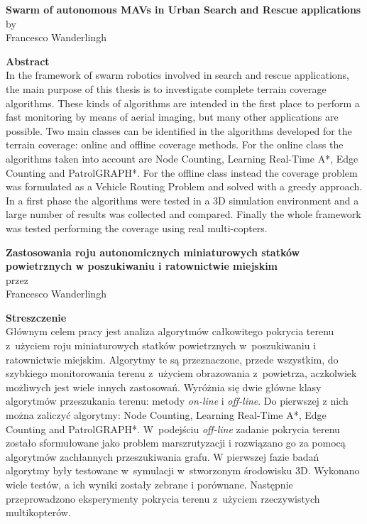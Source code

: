\begin{center}
\Large {\textbf{Swarm of autonomous MAVs in Urban Search and Rescue applications}}\\
\large {by  \\
Francesco Wanderlingh}
\end{center}

\vskip 1cm
\Large {\textbf{Abstract}} \\ 

\large{
In the framework of swarm robotics involved in search and rescue applications, the main purpose of this thesis is to investigate complete 
terrain coverage algorithms. These kinds of algorithms are intended in the first place to perform a fast monitoring by means of aerial 
imaging, but many other applications are possible. Two main classes can be identified in the algorithms developed for the terrain coverage: 
online and offline coverage methods. For the online class the algorithms taken into account are Node Counting, Learning Real-Time A*, Edge 
Counting and PatrolGRAPH*. For the offline class instead the coverage problem was formulated as a Vehicle Routing Problem and solved with a 
greedy approach. In a first phase the algorithms were tested in a 3D simulation environment and a large number of results was collected and 
compared. Finally the whole framework was tested performing the coverage using real multi-copters. }
\clearpage
\null\newpage

\begin{center}
\Large {\bf{Zastosowania roju autonomicznych miniaturowych statków powietrznych w poszukiwaniu i ratownictwie miejskim}}\\
\large {przez  \\
Francesco Wanderlingh}
\end{center}

\vskip 1cm
\Large {\textbf{Streszczenie}} \\


\large{
Głównym celem pracy jest analiza algorytmów całkowitego pokrycia terenu z~użyciem roju miniaturowych statków powietrznych w~poszukiwaniu i ratownictwie miejskim. Algorytmy te są przeznaczone, przede wszystkim, do szybkiego monitorowania terenu z~użyciem obrazowania z~powietrza, aczkolwiek możliwych jest wiele innych zastosowań. Wyróżnia się dwie główne klasy algorytmów przeszukania terenu: me\-tody \emph{on-line} i \emph{off-line}. Do pierwszej z nich można zaliczyć algorytmy: Node Counting, Learning Real-Time A*, Edge Counting and PatrolGRAPH*. W~podejściu \emph{off-line} zadanie pokrycia terenu zostało sformułowane jako problem marszrutyzacji i rozwiązano go za pomocą algorytmów zachłannych przeszukiwania grafu. W pierwszej fazie badań algorytmy były testowane w~symulacji w~stworzonym środowisku 3D. Wykonano wiele testów, a ich wyniki zostały zebrane i porównane. Następnie przeprowadzono eksperymenty pokrycia terenu z~użyciem rzeczywistych multikopterów.   
}
\clearpage
